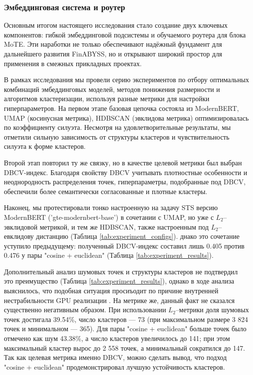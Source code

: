 \subsubsection{Эмбеддинговая система и роутер}
\label{sec:emb_sys_and_router}

Основным итогом настоящего исследования стало создание двух ключевых компонентов: гибкой эмбеддинговой подсистемы
и обучаемого роутера для блока MoTE. Эти наработки не только обеспечивают надёжный фундамент для дальнейшего
развития FinABYSS, но и открывают широкий простор для применения в смежных прикладных проектах.

В рамках исследования мы провели серию экспериментов по отбору оптимальных комбинаций эмбеддинговых моделей,
методов понижения размерности и алгоритмов кластеризации, используя разные метрики для настройки гиперпараметров.
На первом этапе базовая цепочка состояла из ModernBERT, UMAP (косинусная метрика), HDBSCAN (эвклидова метрика)
оптимизировалась по коэффициенту силуэта. Несмотря на удовлетворительные результаты, мы отметили сильную
зависимость от структуры кластеров и чувствительность силуэта к форме кластеров.

Второй этап повторил ту же связку, но в качестве целевой метрики был выбран DBCV-индекс. Благодаря свойству
DBCV учитывать плотностные особенности и неоднородность распределения точек, гиперпараметры, подобранные
под DBCV, обеспечили более семантически согласованные и плотные кластеры.

Наконец, мы протестировали тонко настроенную на задачу STS версию ModernBERT ('gte-modernbert-base') \parencite{Warner2024ModernBERT, MGTE2024} в сочетании с UMAP,
но уже с $L_2$–эвклидовой метрикой, и тем же HDBSCAN, также настроенным под $L_2$–евклидову дистанцию (Таблица \ref{tab:experiment_configs}).
днако это сочетание уступило предыдущему: полученный DBCV-индекс составил лишь 0.405 против 0.476 у пары "cosine + euclidean" (Таблица \ref{tab:experiment_results}).



Дополнительный анализ шумовых точек и структуры кластеров не подтвердил это преимущество (Таблица \ref{tab:experiment_results}),
однако в ходе анализа выяснилось, что подобная ситуация просиъодит по причине внутренней нестрабильности GPU реализации \parencite{cuml2020machine}. На метрике же,
данный факт не сказался существенно негативным образом. При использовании $L_2$–метрики
доля шумовых точек достигала 39.54\%, число кластеров --- 73 (при максимальном размере 3 824 точек и минимальном --- 365).
Для пары "cosine + euclidean" больше точек было отмечено как шум 43.38\%, а число кластеров увеличилось до 141; при этом максимальный
кластер вырос до 2 558 точек, а минимальный сократился до 147. Так как целевая метрика именно DBCV, можно сделать вывод, что
подход "cosine + euclidean" продемонстрировал лучшую устойчивость кластеров.

